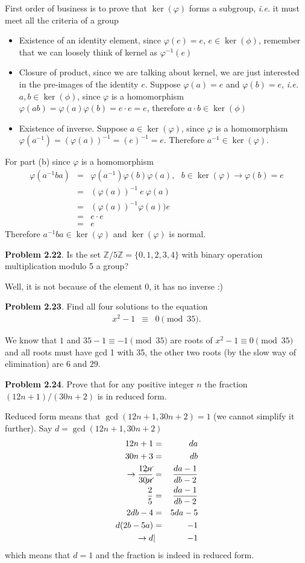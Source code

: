 \documentclass[aps,preprint,preprintnumbers,nofootinbib,showpacs,prd]{revtex4-1}
\newcommand{\ie}{{\it i.e.} }
\newcommand{\bit}{\begin{itemize}}
\newcommand{\eit}{\end{itemize}}
\newcommand{\nbea}{\begin{eqnarray*}}
\newcommand{\neea}{\end{eqnarray*}}
\begin{document}
First order of business is to prove that $\ker(\varphi)$ forms a subgroup, \ie it must meet all the criteria of a group
\bit
\item Existence of an identity element, since $\varphi(e) = e$, $e \in \ker(\phi)$, remember that we can loosely think of kernel as $\varphi^{-1}(e)$
\item Closure of product, since we are talking about kernel, we are just interested in the pre-images of the identity $e$. Suppose $\varphi(a) = e$ and $\varphi(b)=e$, \ie $a,b \in \ker(\phi)$, since $\varphi$ is a homomorphism $\varphi(ab) = \varphi(a)\varphi(b) = e \cdot e = e$, therefore $a\cdot b \in \ker(\phi)$
\item Existence of inverse. Suppose $a \in \ker(\varphi)$, since $\varphi$ is a homomorphism $\varphi(a^{-1}) = (\varphi(a))^{-1} = (e)^{-1} = e$. Therefore $a^{-1} \in \ker(\varphi)$.
\eit

For part (b) since $\varphi$ is a homomorphism 
%
\nbea
\varphi(a^{-1} ba) & = & \varphi(a^{-1}) \varphi(b) \varphi(a), ~~~ b \in \ker(\varphi) \to \varphi(b) = e \\
& = & (\varphi(a))^{-1}~ e ~ \varphi(a) \\
& = & (\varphi(a))^{-1} \varphi(a)) e \\
& = & e \cdot e \\
& = & e
\neea
%
Therefore $a^{-1} ba \in \ker(\varphi)$ and $\ker(\varphi)$ is normal.

{\bf Problem 2.22}. Is the set $\mathbb{Z}/5\mathbb{Z} = \{0, 1, 2, 3, 4\}$ with binary operation multiplication
modulo 5 a group?

Well, it is not because of the element 0, it has no inverse :)

{\bf Problem 2.23}. Find all four solutions to the equation
%
\nbea
x^2 - 1 & \equiv & 0 \pmod{35}.
\neea
%

We know that $1$ and $35-1 \equiv -1 \pmod{35}$ are roots of $x^2-1\equiv 0 \pmod{35}$ and all roots must have gcd 1 with 35,  the other two roots (by the slow way of elimination) are $6$ and $29$.

{\bf Problem 2.24}. Prove that for any positive integer $n$ the fraction $(12n + 1)/(30n + 2)$ is in reduced form.

Reduced form means that $\gcd(12n + 1, 30n + 2) = 1$ (we cannot simplify it further). Say $d = \gcd(12n + 1, 30n + 2)$
%
\nbea
12n + 1 & = & da \\
30n + 3 & = & db \\
\to \frac{12\cancel{n}}{30\cancel{n}} & = & \frac{da - 1}{db - 2} \\
\frac{2}{5} & = & \frac{da - 1}{db - 2} \\
2db - 4 & = & 5da - 5 \\
d(2b - 5a) & = & -1 \\
\to d &|& -1
\neea
%
which means that $d=1$ and the fraction is indeed in reduced form.
\end{document}

